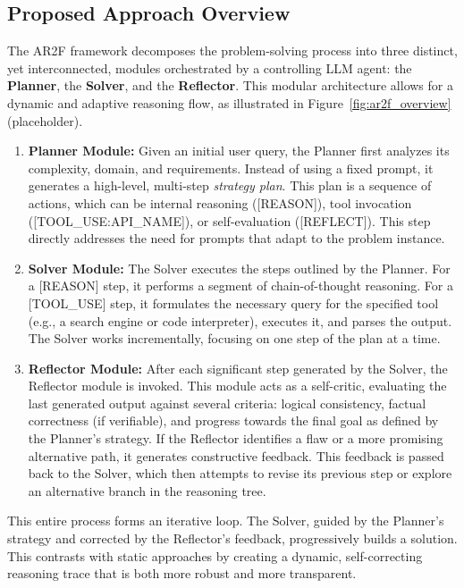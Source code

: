 \documentclass{article}
\begin{document}
\subsection{Proposed Approach Overview}
The AR2F framework decomposes the problem-solving process into three distinct, yet interconnected, modules orchestrated by a controlling LLM agent: the \textbf{Planner}, the \textbf{Solver}, and the \textbf{Reflector}. This modular architecture allows for a dynamic and adaptive reasoning flow, as illustrated in Figure~\ref{fig:ar2f_overview} (placeholder).

\begin{enumerate}
    \item \textbf{Planner Module:} Given an initial user query, the Planner first analyzes its complexity, domain, and requirements. Instead of using a fixed prompt, it generates a high-level, multi-step \textit{strategy plan}. This plan is a sequence of actions, which can be internal reasoning ([REASON]), tool invocation ([TOOL_USE:API_NAME]), or self-evaluation ([REFLECT]). This step directly addresses the need for prompts that adapt to the problem instance.

    \item \textbf{Solver Module:} The Solver executes the steps outlined by the Planner. For a [REASON] step, it performs a segment of chain-of-thought reasoning. For a [TOOL_USE] step, it formulates the necessary query for the specified tool (e.g., a search engine or code interpreter), executes it, and parses the output. The Solver works incrementally, focusing on one step of the plan at a time.

    \item \textbf{Reflector Module:} After each significant step generated by the Solver, the Reflector module is invoked. This module acts as a self-critic, evaluating the last generated output against several criteria: logical consistency, factual correctness (if verifiable), and progress towards the final goal as defined by the Planner's strategy. If the Reflector identifies a flaw or a more promising alternative path, it generates constructive feedback. This feedback is passed back to the Solver, which then attempts to revise its previous step or explore an alternative branch in the reasoning tree.
\end{enumerate}

This entire process forms an iterative loop. The Solver, guided by the Planner's strategy and corrected by the Reflector's feedback, progressively builds a solution. This contrasts with static approaches by creating a dynamic, self-correcting reasoning trace that is both more robust and more transparent.
\end{document}
